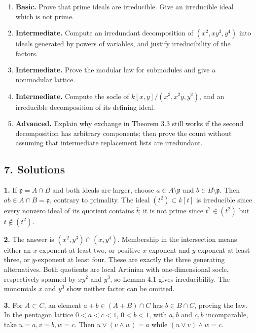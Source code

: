 \documentclass[
]{article}
\providecommand{\tightlist}{%
  \setlength{\itemsep}{0pt}\setlength{\parskip}{0pt}}
\begin{document}
\begin{enumerate}
\def\labelenumi{\arabic{enumi}.}
\tightlist
\item
  \textbf{Basic.} Prove that prime ideals are irreducible. Give an
  irreducible ideal which is not prime.
\item
  \textbf{Intermediate.} Compute an irredundant decomposition of
  \((x^2,xy^3,y^4)\) into ideals generated by powers of variables, and
  justify irreducibility of the factors.
\item
  \textbf{Intermediate.} Prove the modular law for submodules and give a
  nonmodular lattice.
\item
  \textbf{Intermediate.} Compute the socle of \(k[x,y]/(x^3,x^2y,y^2)\),
  and an irreducible decomposition of its defining ideal.
\item
  \textbf{Advanced.} Explain why exchange in Theorem 3.3 still works if
  the second decomposition has arbitrary components; then prove the
  count without assuming that intermediate replacement lists are
  irredundant.
\end{enumerate}

\subsection{7. Solutions}\label{solutions}

\textbf{1.} If \(\mathfrak p=A\cap B\) and both ideals are larger,
choose \(a\in A\setminus\mathfrak p\) and
\(b\in B\setminus\mathfrak p\). Then \(ab\in A\cap B=\mathfrak p\),
contrary to primality. The ideal \((t^2)\subset k[t]\) is irreducible
since every nonzero ideal of its quotient contains \(\bar t\); it is not
prime since \(t^2\in(t^2)\) but \(t\notin(t^2)\).

\textbf{2.} The answer is \((x^2,y^3)\cap(x,y^4)\). Membership in the
intersection means either an \(x\)-exponent at least two, or positive
\(x\)-exponent and \(y\)-exponent at least three, or \(y\)-exponent at
least four. These are exactly the three generating alternatives. Both
quotients are local Artinian with one-dimensional socle, respectively
spanned by \(xy^2\) and \(y^3\), so Lemma 4.1 gives irreducibility. The
monomials \(x\) and \(y^3\) show neither factor can be omitted.

\textbf{3.} For \(A\subset C\), an element \(a+b\in(A+B)\cap C\) has
\(b\in B\cap C\), proving the law. In the pentagon lattice \(0<a<c<1\),
\(0<b<1\), with \(a,b\) and \(c,b\) incomparable, take \(u=a,v=b,w=c\).
Then \(u\vee(v\wedge w)=a\) while \((u\vee v)\wedge w=c\).
\end{document}
